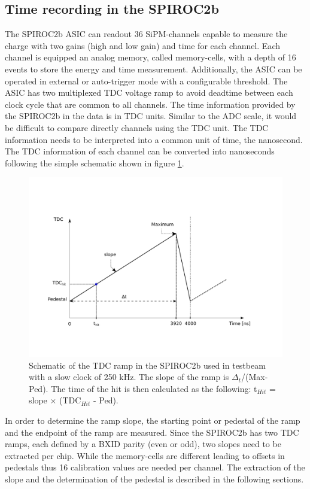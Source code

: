 \documentclass{JINST}
\begin{document}
\subsection{Time recording in the SPIROC2b}

The SPIROC2b ASIC can readout 36 SiPM-channels capable to measure the charge with two gains (high and low gain) and time for each channel. Each channel is equipped an analog memory, called memory-cells, with a depth of 16 events to store the energy and time measurement. Additionally, the ASIC can be operated in external or auto-trigger mode with a configurable threshold. The ASIC has two multiplexed TDC voltage ramp to avoid deadtime between each clock cycle that are common to all channels. The time information provided by the SPIROC2b in the data is in TDC units. Similar to the ADC scale, it would be difficult to compare directly channels using the TDC unit. The TDC information needs to be interpreted into a common unit of time, the nanosecond. The TDC information of each channel can be converted into nanoseconds following the simple schematic shown in figure \ref{fig:ConvertTime}.

\begin{figure}[htbp!]
	\centering
	\includegraphics[width=0.9\linewidth]{fig/TDCRamp.pdf}
	\caption{Schematic of the TDC ramp in the SPIROC2b used in testbeam with a slow clock of 250 kHz. The slope of the ramp is $\Delta_t$/(Max-Ped). The time of the hit is then calculated as the following: t$_{Hit}$ = slope $\times$ (TDC$_{Hit}$ - Ped).} \label{fig:ConvertTime}
\end{figure}

In order to determine the ramp slope, the starting point or pedestal of the ramp and the endpoint of the ramp are measured. Since the SPIROC2b has two TDC ramps, each defined by a BXID parity (even or odd), two slopes need to be extracted per chip. While the memory-cells are different leading to offsets in pedestals thus 16 calibration values are needed per channel. The extraction of the slope and the determination of the pedestal is described in the following sections.
\end{document}

